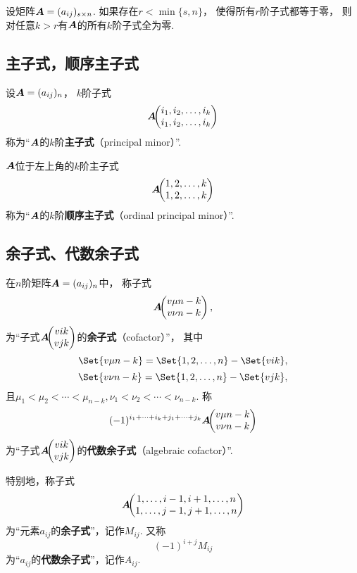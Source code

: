 \begin{property}
设矩阵\(\boldsymbol{A} = (a_{ij})_{s \times n}\).
如果存在\(r < \min\{s,n\}\)，%
使得所有\(r\)阶子式都等于零，%
则对任意\(k > r\)有\(\boldsymbol{A}\)的所有\(k\)阶子式全为零.
\end{property}

\subsection{主子式，顺序主子式}
\begin{definition}
设\(\boldsymbol{A}=(a_{ij})_n\)，%
\(k\)阶子式\[
	\boldsymbol{A}\kern-3.8pt\begin{pmatrix}
		i_1,i_2,\dotsc,i_k \\
		i_1,i_2,\dotsc,i_k
	\end{pmatrix}
\]
称为“\(\boldsymbol{A}\)的\(k\)阶\textbf{主子式}（principal minor）”.

\(\boldsymbol{A}\)位于左上角的\(k\)阶主子式\[
	\boldsymbol{A}\kern-3.8pt\begin{pmatrix}
		1,2,\dotsc,k \\
		1,2,\dotsc,k
	\end{pmatrix}
\]称为“\(\boldsymbol{A}\)的\(k\)阶\textbf{顺序主子式}（ordinal principal minor）”.
\end{definition}

\subsection{余子式、代数余子式}
\begin{definition}
在\(n\)阶矩阵\(\boldsymbol{A}=(a_{ij})_n\)中，
称子式\[
	\boldsymbol{A}\kern-3.8pt\begin{pmatrix}
		v{\mu}{n-k} \\
		v{\nu}{n-k}
	\end{pmatrix},
\]为“子式\(\boldsymbol{A}\kern-3.8pt\begin{pmatrix}
	v{i}{k} \\
	v{j}{k}
\end{pmatrix}\)的\textbf{余子式}（cofactor）”，
其中\[
	\Set{ \v{\mu}{n-k} } = \Set{ 1,2,\dotsc,n } - \Set{ \v{i}{k} },
\]\[
	\Set{ \v{\nu}{n-k} } = \Set{ 1,2,\dotsc,n } - \Set{ \v{j}{k} },
\]
且\(\mu_1<\mu_2<\dotsb<\mu_{n-k},
\nu_1<\nu_2<\dotsb<\nu_{n-k}\).
称\[
	(-1)^{i_1+\dotsb+i_k+j_1+\dotsb+j_k}
	\boldsymbol{A}\kern-3.8pt\begin{pmatrix}
		v{\mu}{n-k} \\
		v{\nu}{n-k}
	\end{pmatrix}
\]为“子式\(\boldsymbol{A}\kern-3.8pt\begin{pmatrix}
	v{i}{k} \\
	v{j}{k}
\end{pmatrix}\)的\textbf{代数余子式}（algebraic cofactor）”.

特别地，称子式\[
	\boldsymbol{A}\kern-3.8pt\begin{pmatrix}
		1,\dotsc,i-1,i+1,\dotsc,n \\
		1,\dotsc,j-1,j+1,\dotsc,n
	\end{pmatrix}
\]为“元素\(a_{ij}\)的\textbf{余子式}”，记作\(M_{ij}\).
又称\[
(-1)^{i+j} M_{ij}
\]为“\(a_{ij}\)的\textbf{代数余子式}”，记作\(A_{ij}\).
\end{definition}

